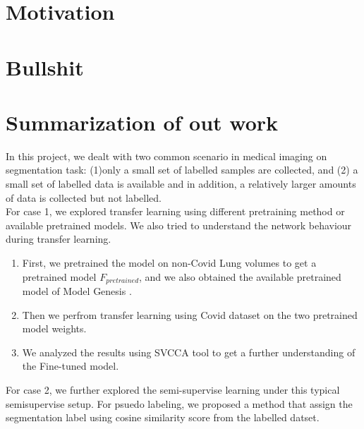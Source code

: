 \section{Motivation}

\section{Bullshit}

\section{Summarization of out work}
{\color{red} In this project, we dealt with two common scenario in medical imaging on segmentation task: (1)only a small set of labelled samples are collected, and (2) a small set of labelled data is available and in addition, a relatively larger amounts of data is collected but not labelled.\\

 For case 1, we explored transfer learning using different pretraining method or available pretrained models. We also tried to understand the network behaviour during transfer learning.\\
 \begin{enumerate}
 	\item First, we pretrained the model on non-Covid Lung volumes to get a pretrained model $F_{pretrained}$, and we also obtained the available pretrained model of Model Genesis \cite{zhou_models_2019}.
 	\item Then we perfrom transfer learning using Covid dataset on the two pretrained model weights.
 	\item We analyzed the results using SVCCA tool to get a further understanding of the Fine-tuned model. 
 \end{enumerate}
 
 For case 2, we further explored the semi-supervise learning under this typical semisupervise setup. For psuedo labeling, we proposed a method that assign the segmentation label using cosine similarity score from the labelled datset. 
 
}
